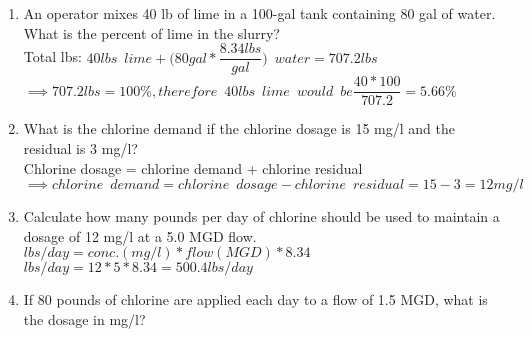 \begin{enumerate}
\item An operator mixes 40 lb of lime in a 100-gal tank containing 80 gal of water. What is the percent of lime in the slurry?\\
\vspace{0.25cm}
Total lbs: $40lbs \enspace lime + \Big(80 gal*\dfrac{8.34lbs}{gal}\Big) \enspace water =707.2 lbs$\\
\vspace{0.2cm}
$\implies 707.2 lbs=100\%, therefore \enspace 40 lbs \enspace lime \enspace would \enspace be \dfrac{40*100}{707.2}=\boxed{5.66\%}$
\vspace{0.25cm}
\item What is the chlorine demand if the chlorine dosage is 15 mg/l and the residual is 3 mg/l?\\
\vspace{0.2cm}
Chlorine dosage = chlorine demand + chlorine residual\\
$\implies chlorine \enspace demand = chlorine \enspace dosage - chlorine \enspace residual=15-3=\boxed{12mg/l}$\\
\vspace{0.25cm}
\item Calculate how many pounds per day of chlorine should be used to maintain a dosage of 12 mg/l at a 5.0 MGD flow.\\
\vspace{0.25cm}
$lbs/day=conc. (mg/l)*flow(MGD)*8.34$\\
\vspace{0.25cm}
$lbs/day=12*5*8.34=\boxed{500.4lbs/day}$\\
\vspace{0.25cm}
\item If 80 pounds of chlorine are applied each day to a flow of 1.5 MGD, what is the dosage in mg/l?\\
\vspace{0.25cm}


\end{enumerate}
